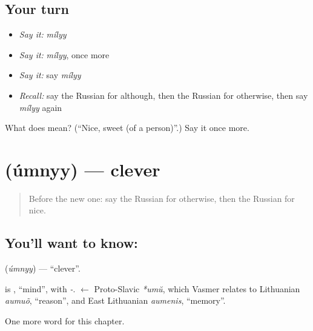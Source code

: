 \subsection*{Your turn}
\begin{itemize}
\raggedright
  \item \emph{Say it:} \emph{mílyy}
  \item \emph{Say it:} \emph{mílyy}, once more
  \item \emph{Say it:} say \emph{mílyy}
  \item \emph{Recall:} say the Russian for although, then the Russian for otherwise, then say \emph{mílyy} again
\end{itemize}

\begin{tcolorbox}[breakable,colback=teal!4,colframe=teal!35!black,title={Before you move on}]
What does  mean? (\textquotedblleft{}Nice, sweet (of a person)\textquotedblright{}.) Say it once more.
\end{tcolorbox}
\section[\texorpdfstring{\ru{умный} (úmnyy)}{умный (úmnyy)}]{ (úmnyy) — clever}

\label{lesson:RU-C155-umnyy}



\begin{quote}
Before the new one: say the Russian for otherwise, then the Russian for nice.
\end{quote}

\subsection*{You'll want to know: }
\textbf{} (\emph{úmnyy}) — \textquotedblleft{}clever\textquotedblright{}.

\begin{cousinweb}
\textbf{} is \emph{}, \textquotedblleft{}mind\textquotedblright{}, with \emph{-}. \emph{} $\leftarrow$ Proto-Slavic \emph{*umŭ}, which Vasmer relates to Lithuanian \emph{aumuõ}, \textquotedblleft{}reason\textquotedblright{}, and East Lithuanian \emph{aumenis}, \textquotedblleft{}memory\textquotedblright{}.
\end{cousinweb}

\begin{grammarlens}[title={What you've built}]
One more word for this chapter.
\end{grammarlens}

